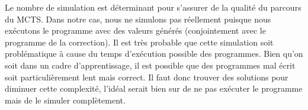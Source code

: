 Le nombre de simulation est déterminant pour s'assurer de la qualité du parcours du MCTS. Dans notre cas, nous ne simulons pas réellement puisque nous exécutons le programme avec des valeurs générés (conjointement avec le programme de la correction). Il est très probable que cette simulation soit problématique à cause du temps d'exécution possible des programmes. Bien qu'on soit dans un cadre d'apprentissage, il est possible que des programmes mal écrit soit particulièrement lent mais correct. Il faut donc trouver des solutions pour diminuer cette complexité, l'idéal serait bien sur de ne pas exécuter le programme mais de le simuler complètement.
